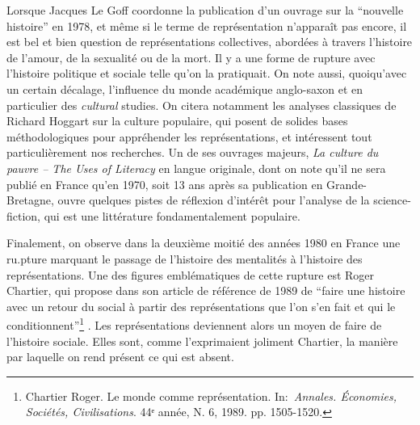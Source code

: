 \documentclass[letterpaper,portrait,12pt]{article}
\begin{document}
	Lorsque Jacques Le Goff coordonne la publication d'un ouvrage sur la {``}nouvelle histoire'' en 1978, et m\^{e}me si le terme de repr\'{e}sentation n'appara\^{i}t pas encore, il est bel et bien question de repr\'{e}sentations collectives, abord\'{e}es \`{a} travers l'histoire de l'amour, de la sexualit\'{e} ou de la mort. Il y a une forme de rupture avec l'histoire politique et sociale telle qu'on la pratiquait. On note aussi, quoiqu'avec un certain d\'{e}calage, l'influence du monde acad\'{e}mique anglo-saxon et en particulier des \emph{cultural }studies. On citera notamment les analyses classiques de Richard Hoggart sur la culture populaire, qui posent de solides bases m\'{e}thodologiques pour appr\'{e}hender les repr\'{e}sentations, et int\'{e}ressent tout particuli\`{e}rement nos recherches. Un de ses ouvrages majeurs,\emph{ La culture du pauvre -- The Uses of Literacy} en langue originale,\emph{ }dont on note qu'il ne sera publi\'{e} en France qu'en 1970, soit 13 ans apr\`{e}s sa publication en Grande-Bretagne, ouvre quelques pistes de r\'{e}flexion d'int\'{e}r\^{e}t pour l'analyse de la science-fiction, qui est une litt\'{e}rature fondamentalement populaire.





	Finalement, on observe dans la deuxi\`{e}me moiti\'{e} des ann\'{e}es 1980 en France une ru.pture marquant le passage de l'histoire des mentalit\'{e}s \`{a} l'histoire des repr\'{e}sentations. Une des figures embl\'{e}matiques de cette rupture est Roger Chartier, qui propose dans son article de r\'{e}f\'{e}rence de 1989 de {``}faire une histoire avec un retour du social \`{a} partir des repr\'{e}sentations que l'on s'en fait et qui le conditionnent''\footnote{	\textcolor[rgb]{0.000,0.000,0.000}{{\small  Chartier Roger. Le monde comme repr\'{e}sentation. In: }}\emph{\textcolor[rgb]{0.000,0.000,0.000}{{\small Annales. \'{E}conomies, Soci\'{e}t\'{e}s, Civilisations}}}\textcolor[rgb]{0.000,0.000,0.000}{{\small . 44ᵉ ann\'{e}e, N. 6, 1989. pp. 1505-1520.}}} . Les repr\'{e}sentations deviennent alors un moyen de faire de l'histoire sociale. Elles sont, comme l'exprimaient joliment Chartier, la mani\`{e}re par laquelle on rend pr\'{e}sent ce qui est absent. 
\end{document}

